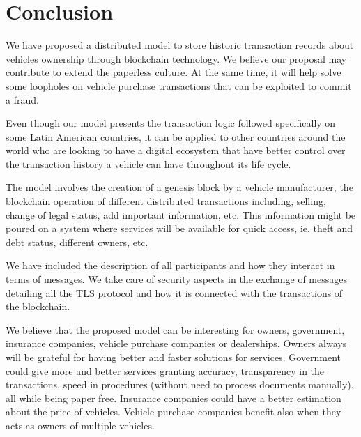 \section{Conclusion}
We have proposed a distributed model to store historic transaction 
records about vehicles ownership through blockchain technology.
We believe our proposal may contribute to extend the paperless culture.
At the same time, it will help solve some loopholes on vehicle purchase transactions
that can be exploited to commit a fraud. 

Even though our model presents the transaction logic 
followed specifically on some Latin American countries, 
it can be applied to other countries around the world 
who are looking to have a digital ecosystem 
that have better control over the transaction history a vehicle can have 
throughout its life cycle.

The model involves the creation of a genesis block by a vehicle manufacturer,
the blockchain operation of different distributed transactions including, selling,
change of legal status, add important information, etc. 
This information might be poured on a system 
where services will be available for quick access, ie. theft and debt status, 
different owners, etc.

We have included the description of all participants and how they interact in terms of 
messages. 
We take care of security aspects in the exchange of messages 
detailing all the TLS protocol and how it is connected with the transactions of the blockchain.

We believe that the proposed model can be interesting for owners, government, insurance companies, 
vehicle purchase companies or dealerships. 
Owners always will be grateful for having better and faster solutions for services. 
Government could give more and better services granting accuracy, transparency in the transactions, 
speed in procedures (without need to process documents manually), all while being paper free. 
Insurance companies could have a better estimation about the price of vehicles. 
Vehicle purchase companies benefit also when they acts as owners of multiple vehicles.

